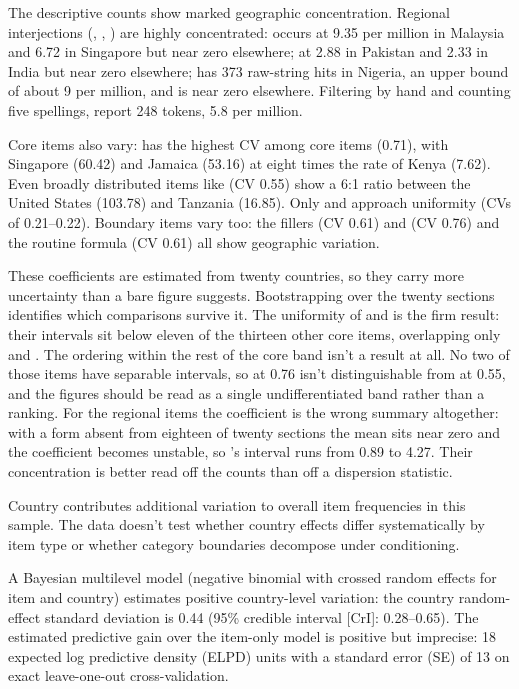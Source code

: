 \documentclass[12pt]{article}
\begin{document}
The descriptive counts show marked geographic concentration. Regional
interjections (, , ) are
highly concentrated:  occurs at 9.35 per million in Malaysia
and 6.72 in Singapore but near zero elsewhere;  at 2.88
in Pakistan and 2.33 in India but near zero elsewhere; 
has 373 raw-string hits in Nigeria, an upper bound of about 9 per million,
and is near zero elsewhere. Filtering by hand and counting five spellings,
\textcite[69]{unuabonahdaniel2020} report 248 tokens, 5.8 per million.

Core items also vary:  has the highest
CV among core items (0.71), with Singapore (60.42) and Jamaica (53.16)
at eight times the rate of Kenya (7.62). Even broadly distributed items
like  (CV 0.55) show a 6:1 ratio between the United
States (103.78) and Tanzania (16.85). Only  and
 approach uniformity (CVs of 0.21--0.22). Boundary items
vary too: the fillers  (CV 0.61) and
 (CV 0.76) and the routine formula  (CV 0.61)
all show geographic variation.

These coefficients are estimated from twenty countries, so they carry more
uncertainty than a bare figure suggests. Bootstrapping over the twenty
sections identifies which comparisons survive it. The
uniformity of  and  is the firm result: their
intervals sit below eleven of the thirteen other core items, overlapping only
 and . The ordering within the rest of the core
band isn't a result at all. No two of those items have separable intervals,
so  at 0.76 isn't distinguishable from  at 0.55,
and the figures should be read as a single undifferentiated band rather than
a ranking. For the regional items the coefficient is the wrong summary
altogether: with a form absent from eighteen of twenty sections the mean sits
near zero and the coefficient becomes unstable, so 's interval runs from 0.89 to 4.27. Their concentration is
better read off the counts than off a dispersion statistic.

Country contributes additional variation to overall item frequencies in this
sample. The data doesn't test whether country effects differ systematically by
item type or whether category boundaries decompose under conditioning.

A Bayesian multilevel model (negative binomial with crossed random effects for
item and country) estimates positive country-level variation: the country
random-effect standard deviation is 0.44 (95\% credible interval [CrI]:
0.28--0.65). The estimated predictive gain over the item-only model is
positive but imprecise: 18 expected log predictive density (ELPD) units with a
standard error (SE) of 13 on exact leave-one-out cross-validation.
\end{document}
